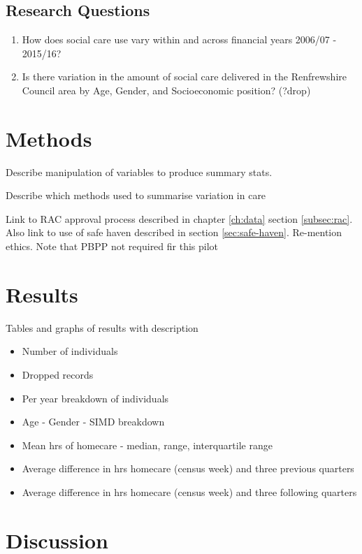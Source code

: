 \documentclass[12pt,]{report}
\begin{document}
\subsection{Research Questions}\label{subsec:renfrew-qs}

\begin{enumerate}[noitemsep]
\item How does social care use vary within and across financial years 2006/07 - 2015/16?
\item Is there variation in the amount of social care delivered in the Renfrewshire Council area by Age, Gender, and Socioeconomic position? (?drop)
\end{enumerate}

\section{Methods}\label{sec:renf-methods}

Describe manipulation of variables to produce summary stats.

Describe which methods used to summarise variation in care

Link to RAC approval process described in chapter \ref{ch:data} section
\ref{subsec:rac}. Also link to use of safe haven described in section
\ref{sec:safe-haven}. Re-mention ethics. Note that PBPP not required fir
this pilot

\section{Results}\label{sec:renf-results}

Tables and graphs of results with description

\begin{itemize}[noitemsep]
\item Number of individuals
\item Dropped records
\item Per year breakdown of individuals
\item Age - Gender - SIMD breakdown
\item Mean hrs of homecare - median, range, interquartile range
\item Average difference in hrs homecare (census week) and three previous quarters
\item Average difference in hrs homecare (census week) and three following quarters
\end{itemize}

\section{Discussion}\label{sec:renf-discuss}
\end{document}

